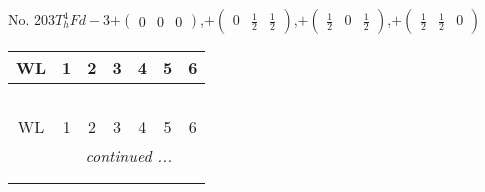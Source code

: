 \documentclass[fleqn,9pt,landscape]{jsarticle}
\begin{document}
\begin{center}
\begin{longtable}{ccccccc}
\end{longtable}
\end{center}
\newpage
No. 203\quad$T_{h}^{4}$\quad$Fd-3$\quad[ cubic ]\quad$+\begin{pmatrix} 0 & 0 & 0 \end{pmatrix}$,\quad $+\begin{pmatrix} 0 & \frac{1}{2} & \frac{1}{2} \end{pmatrix}$,\quad $+\begin{pmatrix} \frac{1}{2} & 0 & \frac{1}{2} \end{pmatrix}$,\quad $+\begin{pmatrix} \frac{1}{2} & \frac{1}{2} & 0 \end{pmatrix}$
\begin{center}
\renewcommand{\arraystretch}{1.2}
\begin{longtable}{ccccccc}
 \hline \hline
WL & 1 & 2 & 3 & 4 & 5 & 6 \\ \hline \endfirsthead

\multicolumn{6}{l}{\tablename\ \thetable{}} \\
 \hline \hline
WL & 1 & 2 & 3 & 4 & 5 & 6 \\ \hline \endhead

 \hline \hline
\multicolumn{6}{r}{\footnotesize\it continued ...} \\ \endfoot

 \hline \hline
\multicolumn{6}{r}{} \\ \endlastfoot


\end{longtable}
\end{center}
\end{document}
